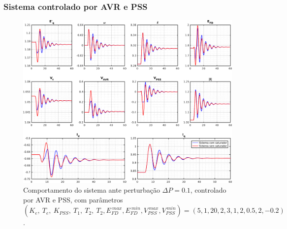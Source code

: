 \documentclass[10pt, compress,xcolor={svgnames,dvipsnames,x11names}]{beamer}
\begin{document}
\begin{frame}%
\frametitle{Sistema controlado por AVR e PSS}
\scriptsize

\begin{figure}[htb]
	\begin{center}
	    \includegraphics[width = 0.85\columnwidth]{../images/presentation/resultadosAVRPSS.pdf}
	\end{center}
	\caption{\label{fig::resultadosAVRPSS} Comportamento do sistema ante perturbação $\Delta P = 0.1$, controlado por AVR e PSS, com parâmetros $\left( K_e,\ T_e,\ K_{PSS},\ T_1,\ T_2,\ T_2,E_{FD}^{\ max},E_{FD}^{\ min},V_{PSS}^{\ max},V_{PSS}^{\ min} \right) = \left( 5,1,20,2,3,1,2,0.5,2,-0.2\right)$.}
\end{figure}

\normalsize
\end{frame}%
\end{document}

